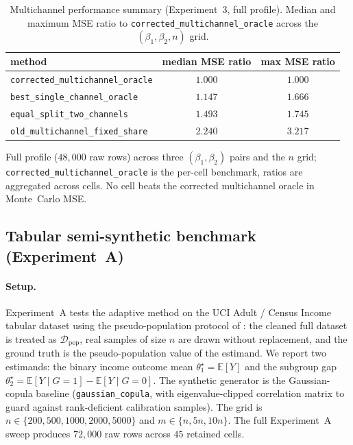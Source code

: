 \begin{table}[!t]
  \centering
  \caption{Multichannel performance summary (Experiment~3, full profile).
  Median and maximum MSE ratio to \texttt{corrected\_multichannel\_oracle}
  across the $(\beta_1, \beta_2, n)$ grid.}
  \label{tab:multi_perf}
  \begin{threeparttable}
  \begin{tabular}{lcc}
    \toprule
    method & median MSE ratio & max MSE ratio \\
    \midrule
    \texttt{corrected\_multichannel\_oracle}    & $1.000$ & $1.000$ \\
    \texttt{best\_single\_channel\_oracle}      & $1.147$ & $1.666$ \\
    \texttt{equal\_split\_two\_channels}        & $1.493$ & $1.745$ \\
    \texttt{old\_multichannel\_fixed\_share}    & $2.240$ & $3.217$ \\
    \bottomrule
  \end{tabular}
  \begin{tablenotes}
    \small
    \item[a] Full profile ($48{,}000$ raw rows) across three
    $(\beta_1, \beta_2)$ pairs and the $n$ grid;
    \texttt{corrected\_multichannel\_oracle} is the per-cell benchmark,
    ratios are aggregated across cells. No cell beats the corrected
    multichannel oracle in Monte~Carlo MSE.
  \end{tablenotes}
  \end{threeparttable}
\end{table}

\subsection{Tabular semi-synthetic benchmark (Experiment~A)}\label{app:expA}

\paragraph{Setup.} Experiment~A tests the adaptive method on the UCI Adult / Census Income tabular dataset using the pseudo-population protocol of : the cleaned full dataset is treated as $\mathcal{D}_{\mathrm{pop}}$, real samples of size $n$ are drawn without replacement, and the ground truth is the pseudo-population value of the estimand. We report two estimands: the binary income outcome mean $\theta_1^\star = \mathbb{E}[Y]$ and the subgroup gap $\theta_2^\star = \mathbb{E}[Y \mid G = 1] - \mathbb{E}[Y \mid G = 0]$. The synthetic generator is the Gaussian-copula baseline (\texttt{gaussian\_copula}, with eigenvalue-clipped correlation matrix to guard against rank-deficient calibration samples). The grid is $n \in \{200, 500, 1000, 2000, 5000\}$ and $m \in \{n, 5n, 10n\}$. The full Experiment~A sweep produces $72{,}000$ raw rows across $45$ retained cells.

